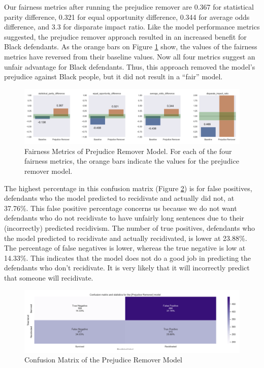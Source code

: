 \documentclass[water,article,submit,moreauthors,pdftex]{mdpi}
\begin{document}
Our fairness metrics after running the prejudice remover are 0.367 for
statistical parity difference, 0.321 for equal opportunity difference,
0.344 for average odds difference, and 3.3 for disparate impact ratio.
Like the model performance metrics suggested, the prejudice remover
approach resulted in an increased benefit for Black defendants. As the
orange bars on Figure \ref{fig:prejudice metrics} show, the values of
the fairness metrics have reversed from their baseline values. Now all
four metrics suggest an unfair advantage for Black defendants. Thus,
this approach removed the model's prejudice against Black people, but it
did not result in a ``fair'' model.

\begin{figure}

{\centering \includegraphics[width=1\linewidth]{../images/prejudice_remover_metrics} 

}

\caption{Fairness Metrics of Prejudice Remover Model. For each of the four fairness metrics, the orange bars indicate the values for the prejudice remover model.}\label{fig:prejudice metrics}
\end{figure}

The highest percentage in this confusion matrix (Figure
\ref{fig:prejudice matrix}) is for false positives, defendants who the
model predicted to recidivate and actually did not, at 37.76\%. This
false positive percentage concerns us because we do not want defendants
who do not recidivate to have unfairly long sentences due to their
(incorrectly) predicted recidivism. The number of true positives,
defendants who the model predicted to recidivate and actually
recidivated, is lower at 23.88\%. The percentage of false negatives is
lower, whereas the true negative is low at 14.33\%. This indicates that
the model does not do a good job in predicting the defendants who don't
recidivate. It is very likely that it will incorrectly predict that
someone will recidivate.

\begin{figure}

{\centering \includegraphics[width=1\linewidth]{../images/prejudice_matrix} 

}

\caption{Confusion Matrix of the Prejudice Remover Model}\label{fig:prejudice matrix}
\end{figure}
\end{document}
